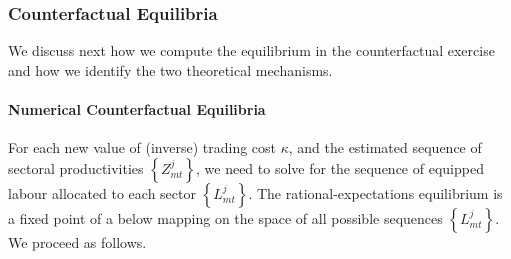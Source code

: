 \documentclass[12pt]{article}
\begin{document}
\subsubsection{Counterfactual Equilibria}

We discuss next how we compute the equilibrium in the counterfactual
exercise and how we identify the two theoretical mechanisms.

\paragraph{Numerical Counterfactual Equilibria}

For each new value of (inverse) trading cost $\kappa $, and the estimated
sequence of sectoral productivities $\left\{ Z_{mt}^{j}\right\} $, we need
to solve for the sequence of equipped labour allocated to each sector $%
\left\{ L_{mt}^{j}\right\} $. The rational-expectations equilibrium is a
fixed point of a below mapping on the space of all possible sequences $%
\left\{ L_{mt}^{j}\right\} $. We proceed as follows.
\end{document}

